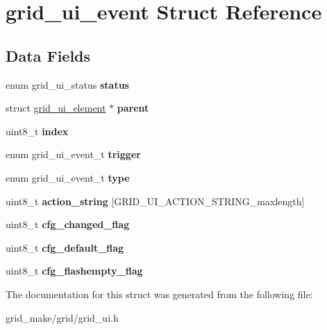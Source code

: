 \hypertarget{structgrid__ui__event}{\section{grid\-\_\-ui\-\_\-event Struct Reference}
\label{structgrid__ui__event}
}
\subsection*{Data Fields}
\begin{DoxyCompactItemize}
\item 
\hypertarget{structgrid__ui__event_a766e4cfe8b5a783b42fc8708e44db7f6}{enum grid\-\_\-ui\-\_\-status {\bfseries status}}\label{structgrid__ui__event_a766e4cfe8b5a783b42fc8708e44db7f6}

\item 
\hypertarget{structgrid__ui__event_a79e07c4fe6eae1597fb87ba165b9ea2f}{struct \hyperlink{structgrid__ui__element}{grid\-\_\-ui\-\_\-element} $\ast$ {\bfseries parent}}\label{structgrid__ui__event_a79e07c4fe6eae1597fb87ba165b9ea2f}

\item 
\hypertarget{structgrid__ui__event_ae4a74fe4b22285ef2b45c1965c3f8b96}{uint8\-\_\-t {\bfseries index}}\label{structgrid__ui__event_ae4a74fe4b22285ef2b45c1965c3f8b96}

\item 
\hypertarget{structgrid__ui__event_ad6873148204c88892952a208b8b37a0e}{enum grid\-\_\-ui\-\_\-event\-\_\-t {\bfseries trigger}}\label{structgrid__ui__event_ad6873148204c88892952a208b8b37a0e}

\item 
\hypertarget{structgrid__ui__event_adcea0e28817c8e5559206cae33120043}{enum grid\-\_\-ui\-\_\-event\-\_\-t {\bfseries type}}\label{structgrid__ui__event_adcea0e28817c8e5559206cae33120043}

\item 
\hypertarget{structgrid__ui__event_a480edc9c9419ac0ea06d85cea7ffc09b}{uint8\-\_\-t {\bfseries action\-\_\-string} \mbox{[}G\-R\-I\-D\-\_\-\-U\-I\-\_\-\-A\-C\-T\-I\-O\-N\-\_\-\-S\-T\-R\-I\-N\-G\-\_\-maxlength\mbox{]}}\label{structgrid__ui__event_a480edc9c9419ac0ea06d85cea7ffc09b}

\item 
\hypertarget{structgrid__ui__event_ad68181b1439330acdb5132a3a450e71a}{uint8\-\_\-t {\bfseries cfg\-\_\-changed\-\_\-flag}}\label{structgrid__ui__event_ad68181b1439330acdb5132a3a450e71a}

\item 
\hypertarget{structgrid__ui__event_aef10b2f314021244bbefeb845cb91dac}{uint8\-\_\-t {\bfseries cfg\-\_\-default\-\_\-flag}}\label{structgrid__ui__event_aef10b2f314021244bbefeb845cb91dac}

\item 
\hypertarget{structgrid__ui__event_a73031ab3a7aeff6ccd0e1f08e8c2e4b4}{uint8\-\_\-t {\bfseries cfg\-\_\-flashempty\-\_\-flag}}\label{structgrid__ui__event_a73031ab3a7aeff6ccd0e1f08e8c2e4b4}

\end{DoxyCompactItemize}


The documentation for this struct was generated from the following file\-:\begin{DoxyCompactItemize}
\item 
grid\-\_\-make/grid/grid\-\_\-ui.\-h\end{DoxyCompactItemize}
